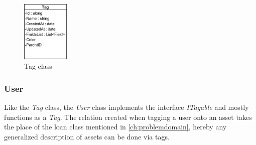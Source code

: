 \begin{figure}[H]
    \centering
    \includegraphics[width=0.2\textwidth]{figures/Implementation/Models/Tag.PNG}
    \caption{Tag class}
    \label{fig:TagClass}
\end{figure}



\subsubsection{User} \label{sssc:Users}
Like the \textit{Tag} class, the \textit{User} class implements the interface \textit{ITagable} and mostly functions as a \textit{Tag}. The relation created when tagging a user onto an asset takes the place of the loan class mentioned in \autoref{ch:problemdomain}, hereby any generalized description of assets can be done via tags. \\